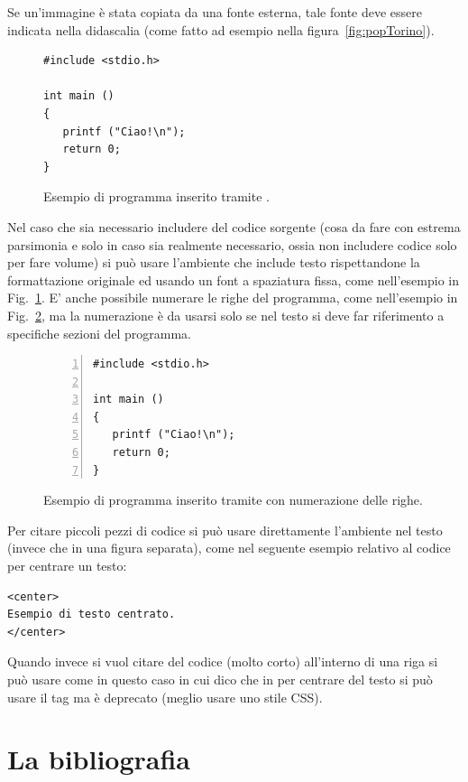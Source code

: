 Se un'immagine è stata copiata da una fonte esterna, tale fonte deve essere indicata nella didascalia (come fatto ad esempio nella figura~\ref{fig:popTorino}).

\begin{figure}[tb]
\HRule
\begin{lstlisting}
#include <stdio.h>

int main ()
{
   printf ("Ciao!\n");
   return 0;
}
\end{lstlisting}
\HRule
\caption{Esempio di programma inserito tramite .\label{fig:prog}}
\end{figure}
Nel caso che sia necessario includere del codice sorgente (cosa da fare con estrema parsimonia e solo in caso sia realmente necessario, ossia non includere codice solo per fare volume) si può usare l'ambiente  che include testo rispettandone la formattazione originale ed usando un font a spaziatura fissa, come nell'esempio in Fig.~\ref{fig:prog}.
E' anche possibile numerare le righe del programma, come nell'esempio in Fig.~\ref{fig:prog-num}, ma la numerazione è da usarsi solo se nel testo si deve far riferimento a specifiche sezioni del programma.

\begin{figure}[tb]
\HRule
\begin{lstlisting}[numbers=left]
#include <stdio.h>

int main ()
{
   printf ("Ciao!\n");
   return 0;
}
\end{lstlisting}
\HRule
\caption{Esempio di programma inserito tramite  con  numerazione delle righe.\label{fig:prog-num}}
\end{figure}

Per citare piccoli pezzi di codice si può usare direttamente l'ambiente  nel testo (invece che in una figura separata), come nel seguente esempio relativo al codice \html per centrare un testo:
\begin{lstlisting}
<center>
Esempio di testo centrato.
</center>
\end{lstlisting}
Quando invece si vuol citare del codice (molto corto) all'interno di una riga si può usare  come in questo caso in cui dico che in \html per centrare del testo si può usare il tag  ma è deprecato (meglio usare uno stile CSS).

\section{La bibliografia}

